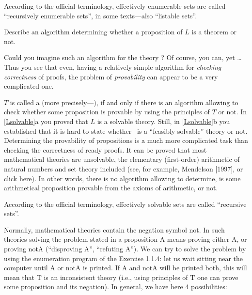 \begin{note}
According to the official terminology, effectively enumerable sets are called ``recursively enumerable sets'', in some texts---also ``listable sets''.
\end{note}

\begin{exercise}\label{Lsolvable}
    \begin{inparaenum}[(a)]
        \item Describe an algorithm determining whether a proposition of \(L\) is a theorem or not.
        \item Could you imagine such an algorithm for the theory \CHESS?
        Of course, you can, yet \ldots
        Thus you see that even, having a relatively simple algorithm for \emph{checking correctness} of proofs, the problem of \emph{provability} can appear to be a very complicated one.
    \end{inparaenum}
\end{exercise}

\(T\) is called a  (more precisely---), if and only if there is an algorithm allowing to check whether some proposition is provable by using the principles of \(T\) or not.
In \cref{Lsolvable}a you proved that \(L\) is a solvable theory.
Still, in \cref{Lsolvable}b you established that it is hard to state whether \CHESS\ is a ``feasibly solvable'' theory or not.
Determining the provability of propositions is a much more complicated task than checking the correctness of ready proofs.
It can be proved that most mathematical theories are unsolvable, the elementary (first-order) arithmetic of natural numbers and set theory included (see, for example, Mendelson [1997], or click here).
In other words, there is no algorithm allowing to determine, is some arithmetical proposition provable from the axioms of arithmetic, or not.

\begin{note}
According to the official terminology, effectively solvable sets are called ``recursive sets''.
\end{note}

Normally, mathematical theories contain the negation symbol not. In such theories solving the problem stated in a proposition A means proving either A, or proving notA (``disproving A'', ``refuting A''). We can try to solve the problem by using the enumeration program of the Exercise 1.1.4: let us wait sitting near the computer until A or notA is printed. If A and notA will be printed both, this will mean that T is an inconsistent theory (i.e., using principles of T one can prove some proposition and its negation). In general, we have here 4 possibilities:

